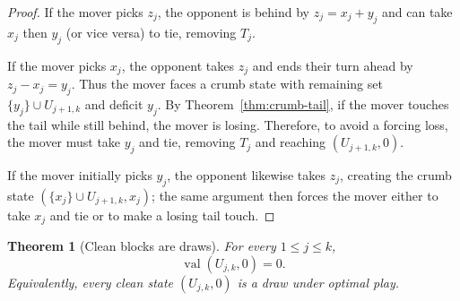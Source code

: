 \documentclass[11pt]{article}
\newtheorem{theorem}{Theorem}[section]
\newcommand{\val}{\operatorname{val}}
\begin{document}
\begin{proof}
If the mover picks $z_j$, the opponent is behind by $z_j=x_j+y_j$ and can take $x_j$ then $y_j$ (or vice versa) to tie, removing $T_j$.

If the mover picks $x_j$, the opponent takes $z_j$ and ends their turn ahead by $z_j-x_j=y_j$.
Thus the mover faces a crumb state with remaining set $\{y_j\}\cup U_{j+1,k}$ and deficit $y_j$.
By Theorem~\ref{thm:crumb-tail}, if the mover touches the tail while still behind, the mover is losing.
Therefore, to avoid a forcing loss, the mover must take $y_j$ and tie, removing $T_j$ and reaching $(U_{j+1,k},0)$.

If the mover initially picks $y_j$, the opponent likewise takes $z_j$, creating the crumb state
$(\{x_j\}\cup U_{j+1,k},x_j)$; the same argument then forces the mover either to take $x_j$ and tie or to make a losing tail touch.
\end{proof}

\begin{theorem}[Clean blocks are draws]\label{thm:blockdraw}
For every $1\le j\le k$,
\[
\val(U_{j,k},0)=0.
\]
Equivalently, every clean state $(U_{j,k},0)$ is a draw under optimal play.
\end{theorem}
\end{document}
